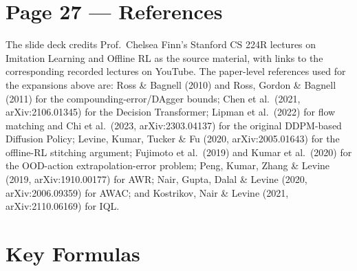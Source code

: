 \documentclass[11pt]{article}
\begin{document}
\section*{Page 27 --- References}

The slide deck credits Prof.\ Chelsea Finn's Stanford CS 224R lectures on Imitation Learning and Offline RL as the source material, with links to the corresponding recorded lectures on YouTube. The paper-level references used for the expansions above are: Ross \& Bagnell (2010) and Ross, Gordon \& Bagnell (2011) for the compounding-error/DAgger bounds; Chen et al.\ (2021, arXiv:2106.01345) for the Decision Transformer; Lipman et al.\ (2022) for flow matching and Chi et al.\ (2023, arXiv:2303.04137) for the original DDPM-based Diffusion Policy; Levine, Kumar, Tucker \& Fu (2020, arXiv:2005.01643) for the offline-RL stitching argument; Fujimoto et al.\ (2019) and Kumar et al.\ (2020) for the OOD-action extrapolation-error problem; Peng, Kumar, Zhang \& Levine (2019, arXiv:1910.00177) for AWR; Nair, Gupta, Dalal \& Levine (2020, arXiv:2006.09359) for AWAC; and Kostrikov, Nair \& Levine (2021, arXiv:2110.06169) for IQL.

\section*{Key Formulas}
\end{document}
